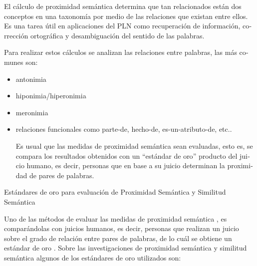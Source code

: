 \documentclass[letterpaper]{article}
\newcommand\textstylebibuscitbase[1]{#1}
\newcommand\liststyleWWviiiNumxvi{%
\renewcommand\labelitemi{{\textbullet}}
\renewcommand\labelitemii{${\circ}$}
\renewcommand\labelitemiii{${\blacksquare}$}
\renewcommand\labelitemiv{{\textbullet}}
}
\begin{document}
\bigskip

{\sffamily
\textstylebibuscitbase{\foreignlanguage{spanish}{El c\'alculo de
proximidad sem\'antica determina que tan relacionados est\'an dos
}}\textstylebibuscitbase{\foreignlanguage{spanish}{conceptos en una
taxonom\'ia por medio de las relaciones que existan entre ellos.
}}\textstylebibuscitbase{\foreignlanguage{spanish}{Es una tarea
\'util}}\textstylebibuscitbase{\foreignlanguage{spanish}{ en
aplicaciones del PLN como recuperaci\'on de informaci\'on, correcci\'on
ortogr\'afica y desambiguaci\'on del sentido de las
}}\textstylebibuscitbase{\foreignlanguage{spanish}{palabras.}}}


\bigskip

{\sffamily
\textstylebibuscitbase{\foreignlanguage{spanish}{Para realizar estos
c\'alculos se analizan las relaciones entre palabras, las m\'as comunes
son:}}}


\bigskip

\liststyleWWviiiNumxvi
\begin{itemize}
\item {\sffamily
\textstylebibuscitbase{\foreignlanguage{spanish}{antonimia}}}
\item {\sffamily
\textstylebibuscitbase{\foreignlanguage{spanish}{hiponimia/hiperonimia}}}
\item {\sffamily
\textstylebibuscitbase{\foreignlanguage{spanish}{meronimia}}}
\item {\sffamily
\textstylebibuscitbase{\foreignlanguage{spanish}{relaciones funcionales
como parte-de, hecho-de, es-un-atributo-de, etc..}}}


\bigskip

{\sffamily
\textstylebibuscitbase{\foreignlanguage{spanish}{Es usual que las
medidas de proximidad sem\'antica sean evaluadas, esto es, se compara
los resultados obtenidos con un {\textquotedblleft}est\'andar de
oro{\textquotedblright} producto del juicio humano, es decir, personas
que en base a su juicio determinan la proximidad de pares de
palabras.}}}
\end{itemize}

\bigskip

{\sffamily
Est\'andares de oro para evaluaci\'on de Proximidad Sem\'antica y
Similitud Sem\'antica}


\bigskip

{\sffamily
Uno de las m\'etodos de evaluar las medidas de proximidad sem\'antica ,
es compar\'andolas con juicios humanos, es decir, personas que realizan
un juicio sobre el grado de relaci\'on entre pares de palabras, de lo
cu\'al se obtiene un est\'andar de oro . Sobre las investigaciones de
proximidad sem\'antica y similitud sem\'antica algunos de los
est\'andares de oro utilizados son:}
\end{document}
